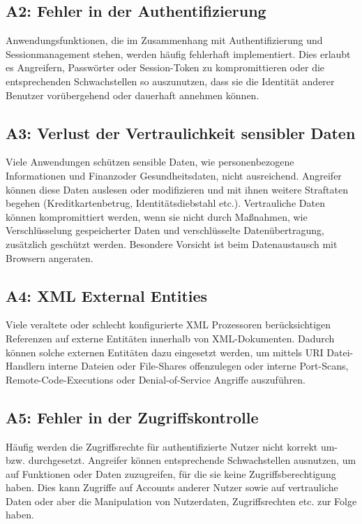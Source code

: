 \documentclass[12pt,oneside,a4paper,parskip]{scrbook}
\begin{document}
\subsection{A2: Fehler in der Authentifizierung}
Anwendungsfunktionen, die im Zusammenhang mit Authentifizierung und Sessionmanagement
stehen, werden häufig fehlerhaft implementiert. Dies erlaubt es Angreifern, Passwörter oder
Session-Token zu kompromittieren oder die entsprechenden Schwachstellen so auszunutzen,
dass sie die Identität anderer Benutzer vorübergehend oder dauerhaft annehmen können.

\subsection{A3: Verlust der Vertraulichkeit sensibler Daten}
Viele Anwendungen schützen sensible Daten, wie personenbezogene Informationen und Finanzoder
Gesundheitsdaten, nicht ausreichend. Angreifer können diese Daten auslesen oder
modifizieren und mit ihnen weitere Straftaten begehen (Kreditkartenbetrug, Identitätsdiebstahl
etc.). Vertrauliche Daten können kompromittiert werden, wenn sie nicht durch Maßnahmen, wie
Verschlüsselung gespeicherter Daten und verschlüsselte Datenübertragung, zusätzlich geschützt
werden. Besondere Vorsicht ist beim Datenaustausch mit Browsern angeraten.

\subsection{A4: XML External Entities}
Viele veraltete oder schlecht konfigurierte XML Prozessoren berücksichtigen Referenzen auf
externe Entitäten innerhalb von XML-Dokumenten. Dadurch können solche externen Entitäten
dazu eingesetzt werden, um mittels URI Datei-Handlern interne Dateien oder File-Shares offenzulegen
oder interne Port-Scans, Remote-Code-Executions oder Denial-of-Service Angriffe
auszuführen.

\subsection{A5: Fehler in der Zugriffskontrolle}
Häufig werden die Zugriffsrechte für authentifizierte Nutzer nicht korrekt um- bzw. durchgesetzt.
Angreifer können entsprechende Schwachstellen ausnutzen, um auf Funktionen oder Daten
zuzugreifen, für die sie keine Zugriffsberechtigung haben. Dies kann Zugriffe auf Accounts
anderer Nutzer sowie auf vertrauliche Daten oder aber die Manipulation von Nutzerdaten,
Zugriffsrechten etc. zur Folge haben.
\end{document}
